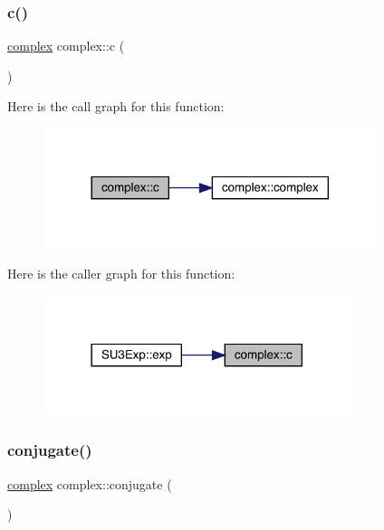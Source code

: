 \subsubsection{\texorpdfstring{c()}{c()}}
{\footnotesize\ttfamily \mbox{\hyperlink{classcomplex}{complex}} complex\+::c (\begin{DoxyParamCaption}{ }\end{DoxyParamCaption})}

Here is the call graph for this function\+:\nopagebreak
\begin{figure}[H]
\begin{center}
\leavevmode
\includegraphics[width=276pt]{classcomplex_a4741546b5617d11e87ee7831067c84c5_cgraph}
\end{center}
\end{figure}
Here is the caller graph for this function\+:\nopagebreak
\begin{figure}[H]
\begin{center}
\leavevmode
\includegraphics[width=254pt]{classcomplex_a4741546b5617d11e87ee7831067c84c5_icgraph}
\end{center}
\end{figure}
\mbox{\label{classcomplex_af21a3dae4577a3aab8e1105a1b919b81}} 
\subsubsection{\texorpdfstring{conjugate()}{conjugate()}}
{\footnotesize\ttfamily \mbox{\hyperlink{classcomplex}{complex}} complex\+::conjugate (\begin{DoxyParamCaption}{ }\end{DoxyParamCaption})}

